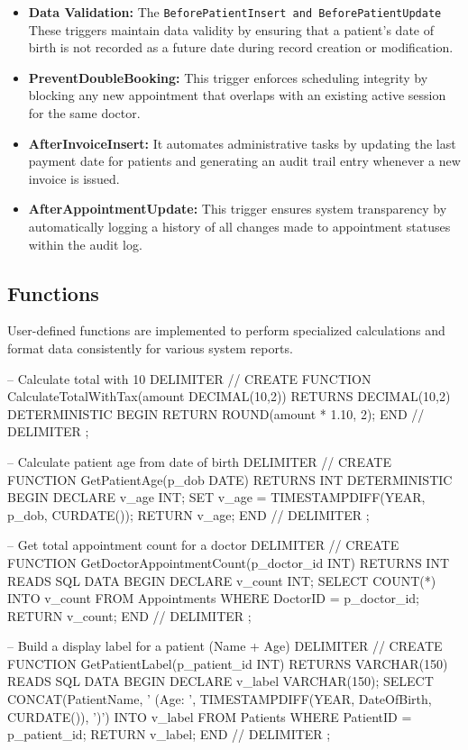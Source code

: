 \begin{itemize}
    \item \textbf{Data Validation:} The \texttt{BeforePatientInsert and BeforePatientUpdate} These triggers maintain data validity by ensuring that a patient's date of birth is not recorded as a future date during record creation or modification.
    \item \textbf{PreventDoubleBooking:} This trigger enforces scheduling integrity by blocking any new appointment that overlaps with an existing active session for the same doctor.
    \item \textbf{AfterInvoiceInsert:} It automates administrative tasks by updating the last payment date for patients and generating an audit trail entry whenever a new invoice is issued.
    \item \textbf{AfterAppointmentUpdate:} This trigger ensures system transparency by automatically logging a history of all changes made to appointment statuses within the audit log.
\end{itemize}

\subsection{Functions}
User-defined functions are implemented to perform specialized calculations and format data consistently for various system reports.

\begin{sqlcode}
-- Calculate total with 10%
DELIMITER //
CREATE FUNCTION CalculateTotalWithTax(amount DECIMAL(10,2))
RETURNS DECIMAL(10,2)
DETERMINISTIC
BEGIN
    RETURN ROUND(amount * 1.10, 2);
END //
DELIMITER ;

-- Calculate patient age from date of birth
DELIMITER //
CREATE FUNCTION GetPatientAge(p_dob DATE)
RETURNS INT
DETERMINISTIC
BEGIN
    DECLARE v_age INT;
    SET v_age = TIMESTAMPDIFF(YEAR, p_dob, CURDATE());
    RETURN v_age;
END //
DELIMITER ;

-- Get total appointment count for a doctor
DELIMITER //
CREATE FUNCTION GetDoctorAppointmentCount(p_doctor_id INT)
RETURNS INT
READS SQL DATA
BEGIN
    DECLARE v_count INT;
    SELECT COUNT(*) INTO v_count
    FROM Appointments
    WHERE DoctorID = p_doctor_id;
    RETURN v_count;
END //
DELIMITER ;

-- Build a display label for a patient (Name + Age)
DELIMITER //
CREATE FUNCTION GetPatientLabel(p_patient_id INT)
RETURNS VARCHAR(150)
READS SQL DATA
BEGIN
    DECLARE v_label VARCHAR(150);
    SELECT CONCAT(PatientName, ' (Age: ', TIMESTAMPDIFF(YEAR, DateOfBirth, CURDATE()), ')')
    INTO v_label
    FROM Patients
    WHERE PatientID = p_patient_id;
    RETURN v_label;
END //
DELIMITER ;
\end{sqlcode}

